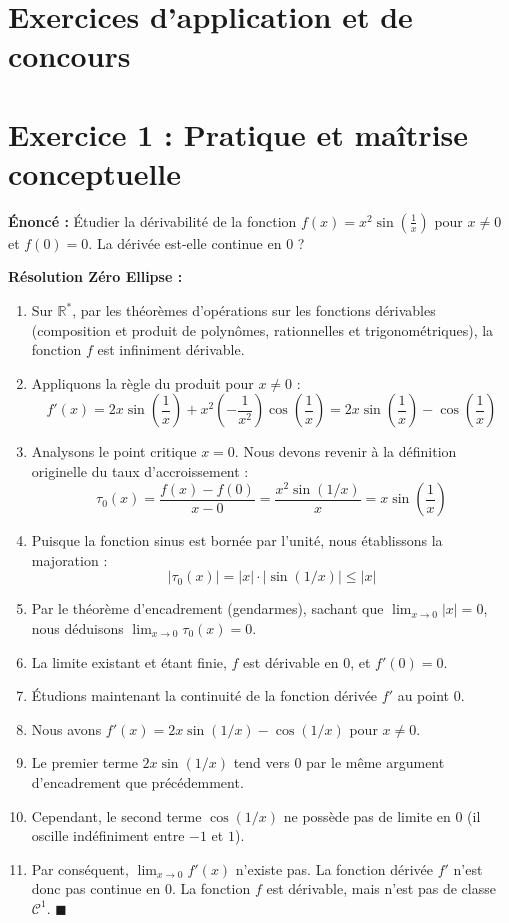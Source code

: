 \documentclass[11pt,a4paper]{article}
\begin{document}
\newpage
\section{Exercices d'application et de concours}

\section*{Exercice 1 : Pratique et maîtrise conceptuelle}

\textbf{Énoncé :}
Étudier la dérivabilité de la fonction $f(x) = x^2 \sin\left(\frac{1}{x}\right)$ pour $x \neq 0$ et $f(0)=0$. La dérivée est-elle continue en $0$ ?

\textbf{Résolution Zéro Ellipse :}
\begin{enumerate}
\item Sur $\mathbb{R}^*$, par les théorèmes d'opérations sur les fonctions dérivables (composition et produit de polynômes, rationnelles et trigonométriques), la fonction $f$ est infiniment dérivable.
\item Appliquons la règle du produit pour $x \neq 0$ :
   \[  f'(x) = 2x \sin\left(\frac{1}{x}\right) + x^2 \left( -\frac{1}{x^2} \right) \cos\left(\frac{1}{x}\right) = 2x \sin\left(\frac{1}{x}\right) - \cos\left(\frac{1}{x}\right)  \]
\item Analysons le point critique $x=0$. Nous devons revenir à la définition originelle du taux d'accroissement :
   \[  \tau_0(x) = \frac{f(x) - f(0)}{x - 0} = \frac{x^2 \sin(1/x)}{x} = x \sin\left(\frac{1}{x}\right)  \]
\item Puisque la fonction sinus est bornée par l'unité, nous établissons la majoration :
   \[  |\tau_0(x)| = |x| \cdot |\sin(1/x)| \leq |x|  \]
\item Par le théorème d'encadrement (gendarmes), sachant que $\lim_{x \to 0} |x| = 0$, nous déduisons $\lim_{x \to 0} \tau_0(x) = 0$.
\item La limite existant et étant finie, $f$ est dérivable en $0$, et $f'(0) = 0$.
\item Étudions maintenant la continuité de la fonction dérivée $f'$ au point $0$.
\item Nous avons $f'(x) = 2x \sin(1/x) - \cos(1/x)$ pour $x \neq 0$.
\item Le premier terme $2x \sin(1/x)$ tend vers $0$ par le même argument d'encadrement que précédemment.
\item Cependant, le second terme $\cos(1/x)$ ne possède pas de limite en $0$ (il oscille indéfiniment entre $-1$ et $1$).
\item Par conséquent, $\lim_{x \to 0} f'(x)$ n'existe pas. La fonction dérivée $f'$ n'est donc pas continue en $0$. La fonction $f$ est dérivable, mais n'est pas de classe $\mathcal{C}^1$. $\blacksquare$
\end{enumerate}
\end{document}
